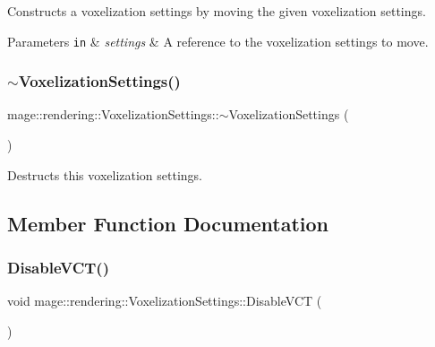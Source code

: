 Constructs a voxelization settings by moving the given voxelization settings.


\begin{DoxyParams}[1]{Parameters}
\mbox{\tt in}  & {\em settings} & A reference to the voxelization settings to move. \\
\hline
\end{DoxyParams}
\hypertarget{classmage_1_1rendering_1_1_voxelization_settings_aa9593796b2dd3b9d3a8f6b00ba225778}{}\label{classmage_1_1rendering_1_1_voxelization_settings_aa9593796b2dd3b9d3a8f6b00ba225778} 
\subsubsection{\texorpdfstring{$\sim$\+Voxelization\+Settings()}{~VoxelizationSettings()}}
{\footnotesize\ttfamily mage\+::rendering\+::\+Voxelization\+Settings\+::$\sim$\+Voxelization\+Settings (\begin{DoxyParamCaption}{ }\end{DoxyParamCaption})\hspace{0.3cm}{\ttfamily [default]}}

Destructs this voxelization settings. 

\subsection{Member Function Documentation}
\hypertarget{classmage_1_1rendering_1_1_voxelization_settings_a7092d02a0878dad9ec4fa21ce1024147}{}\label{classmage_1_1rendering_1_1_voxelization_settings_a7092d02a0878dad9ec4fa21ce1024147} 
\subsubsection{\texorpdfstring{Disable\+V\+C\+T()}{DisableVCT()}}
{\footnotesize\ttfamily void mage\+::rendering\+::\+Voxelization\+Settings\+::\+Disable\+V\+CT (\begin{DoxyParamCaption}{ }\end{DoxyParamCaption})\hspace{0.3cm}{\ttfamily [noexcept]}}

